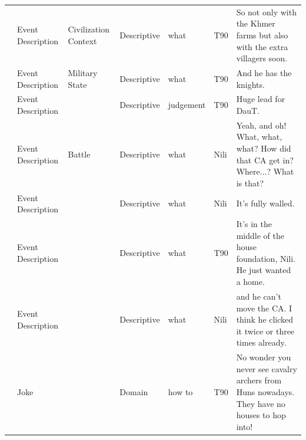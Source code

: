 {\begin{longtable}{@{}>{\theAppRow}r|L{2.3cm}L{2.2cm}L{1.4cm}L{2.2cm}L{0.5cm}U{5.6cm}@{}}
    & Event Description     & Civilization Context & Descriptive   & what              & T90     & So not only with the Khmer farms but also with the extra villagers soon.                                                                                                                                                 \\
    & Event Description     & Military State       & Descriptive   & what              & T90     & And he has the knights.                                                                                                                                                                                                  \\
    & Event Description     &                      & Descriptive   & judgement         & T90     & Huge lead for DauT.                                                                                                                                                                                                      \\
    & Event Description     & Battle               & Descriptive   & what              & Nili    & Yeah, and oh! What, what, what? How did that CA get in? Where...? What is that?                                                                                                                                          \\
    & Event Description     &                      & Descriptive   & what              & Nili    & It's fully walled.                                                                                                                                                                                                       \\
    & Event Description     &                      & Descriptive   & what              & T90     & It's in the middle of the house foundation, Nili. He just wanted a home.                                                                                                                                                 \\
    & Event Description     &                      & Descriptive   & what              & Nili    & and he can't move the CA. I think he clicked it twice or three times already.                                                                                                                                            \\
    & Joke                  &                      & Domain      & how to            & T90     & No wonder you never see cavalry archers from Huns nowadays. They have no houses to hop into!                                                                                                                             \\

\end{longtable}}
